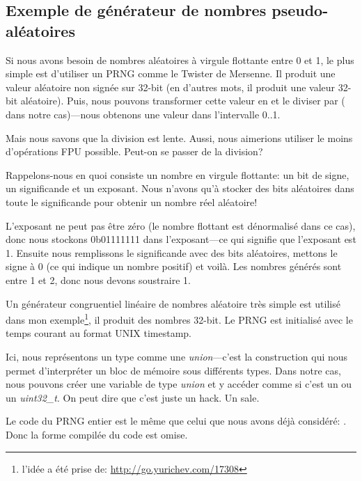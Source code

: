 \subsection{Exemple de générateur de nombres pseudo-aléatoires}
\label{FPU_PRNG}

Si nous avons besoin de nombres aléatoires à virgule flottante entre 0 et 1, le plus
simple est d'utiliser un \ac{PRNG} comme le Twister de Mersenne.
Il produit une valeur aléatoire non signée sur 32-bit (en d'autres mots, il produit
une valeur 32-bit aléatoire).
Puis, nous pouvons transformer cette valeur en \Tfloat et le diviser par 
( dans notre cas)---nous obtenons une valeur dans l'intervalle 0..1.

Mais nous savons que la division est lente.
Aussi, nous aimerions utiliser le moins d'opérations FPU possible.
Peut-on se passer de la division?


Rappelons-nous en quoi consiste un nombre en virgule flottante: un bit de signe,
un significande et un exposant.
Nous n'avons qu'à stocker des bits aléatoires dans toute le significande pour obtenir
un nombre réel aléatoire!

L'exposant ne peut pas être zéro (le nombre flottant est dénormalisé dans ce cas),
donc nous stockons 0b01111111 dans l'exposant---ce qui signifie que l'exposant est
1.
Ensuite nous remplissons le significande avec des bits aléatoires, mettons le signe à
0 (ce qui indique un nombre positif) et voilà.
Les nombres générés sont entre 1 et 2, donc nous devons soustraire 1.

\newcommand{\URLXOR}{\url{http://go.yurichev.com/17308}}

Un générateur congruentiel linéaire de nombres aléatoire très simple est utilisé dans
mon exemple\footnote{l'idée a été prise de: \URLXOR}, il produit des nombres 32-bit.
Le \ac{PRNG} est initialisé avec le temps courant au format UNIX timestamp.

Ici, nous représentons un type \Tfloat comme une \emph{union}---c'est la construction \CCpp qui nous
permet d'interpréter un bloc de mémoire sous différents types.
Dans notre cas, nous pouvons créer une variable de type \emph{union} et y accéder comme
si c'est un \Tfloat ou un \emph{uint32\_t}.
On peut dire que c'est juste un hack. Un sale.


Le code du \ac{PRNG} entier est le même que celui que nous avons déjà considéré: .
Donc la forme compilée du code est omise.


